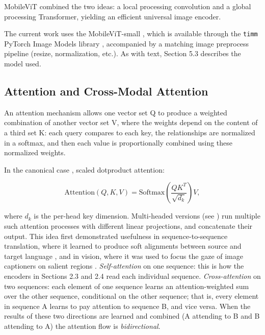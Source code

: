 \documentclass[10pt,twoside]{article}
\newcommand{\code}[1]{\texttt{#1}}
\begin{document}
MobileViT \citep{mehta2022mobilevit} combined the two ideas: a local processing convolution and a global processing Transformer, yielding an efficient universal image encoder.

The current work uses the MobileViT-small \citep{mehta2022mobilevit}, which is available through the \code{timm} PyTorch Image Models library \citep{wightman2019timm}, accompanied by a matching image preprocess pipeline (resize, normalization, etc.). As with text, Section 5.3 describes the model used.

\subsection{Attention and Cross-Modal Attention}\label{sec:2.5}

An attention mechanism allows one vector set Q to produce a weighted combination of another vector set V, where the weights depend on the content of a third set K: each query compares to each key, the relationships are normalized in a softmax, and then each value is proportionally combined using these normalized weights.

In the canonical case \citep{vaswani2017attention}, scaled dotproduct attention:

\begin{equation}\label{eq:1}
\text{Attention}(Q, K, V) = \text{Softmax}\!\left( \frac{QK^{T}}{\sqrt{d_k}} \right) V,
\end{equation}

where $d_k$ is the per-head key dimension. Multi-headed versions (see \citep{vaswani2017attention}) run multiple such attention processes with different linear projections, and concatenate their output. This idea first demonstrated usefulness in sequence-to-sequence translation, where it learned to produce soft alignments between source and target language \citep{bahdanau2015align}, and in vision, where it was used to focus the gaze of image captioners on salient regions \citep{xu2015show}. \emph{Self-attention} on one sequence: this is how the encoders in Sections 2.3 and 2.4 read each individual sequence. \emph{Cross-attention} on two sequences: each element of one sequence learns an attention-weighted sum over the other sequence, conditional on the other sequence; that is, every element in sequence A learns to pay attention to sequence B, and vice versa. When the results of these two directions are learned and combined (A attending to B and B attending to A) the attention flow is \emph{bidirectional}.
\end{document}
